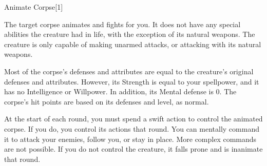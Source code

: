 \begin{spellsection}{Animate Corpse}[1]
    \begin{spellheader}
    \end{spellheader}
    \begin{spellcontent}
        \begin{spelltargetinginfo}
        \end{spelltargetinginfo}
        \begin{spelleffects}
            \spelleffect The target corpse animates and fights for you.
            It does not have any special abilities the creature had in life, with the exception of its natural weapons.
            The creature is only capable of making unarmed attacks, or attacking with its natural weapons.

            Most of the corpse's defenses and attributes are equal to the creature's original defenses and attributes.
            However, its Strength is equal to your spellpower, and it has no Intelligence or Willpower.
            In addition, its Mental defense is 0.
            The corpse's hit points are based on its defenses and level, as normal.

            At the start of each round, you must spend a swift action to control the animated corpse.
            If you do, you control its actions that round.
            You can mentally command it to attack your enemies, follow you, or stay in place.
            More complex commands are not possible.
            If you do not control the creature, it falls prone and is inanimate that round.

            \spelldur \durshort \dismissable
        \end{spelleffects}
    \end{spellcontent}
    \begin{spellfooter}
        \miscastrandom
    \end{spellfooter}
\end{spellsection}

